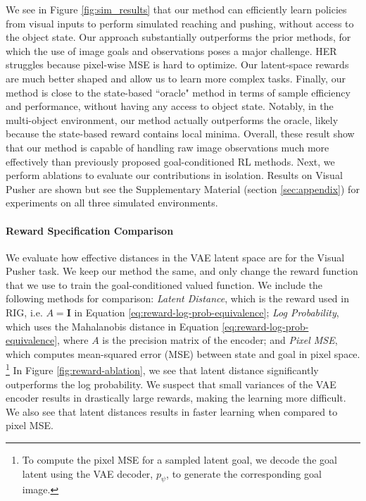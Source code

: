 \documentclass{article}
\begin{document}
We see in Figure \ref{fig:sim_results} that our method can efficiently learn policies from visual inputs to perform simulated reaching and pushing, without access to the object state.
Our approach substantially outperforms the prior methods, for which the use of image goals and observations poses a major challenge.
HER struggles because pixel-wise MSE is hard to optimize. Our latent-space rewards are much better shaped and allow us to learn more complex tasks.
Finally, our method is close to the state-based ``oracle" method in terms of sample efficiency and performance, without having any access to object state.
Notably, in the multi-object environment, our method actually outperforms the oracle, likely because the state-based reward contains local minima.
Overall, these result show that our method is capable of handling raw image observations much more effectively than previously proposed goal-conditioned RL methods. Next, we perform ablations to evaluate our contributions in isolation. Results on Visual Pusher are shown but see the Supplementary Material (section \ref{sec:appendix}) for experiments on all three simulated environments.

\vspace{-0.1in}
\paragraph{Reward Specification Comparison}

We evaluate how effective distances in the VAE latent space are for the Visual Pusher task.
We keep our method the same, and only change the reward function that we use to train the goal-conditioned valued function.
We include the following methods for comparison:
\textit{Latent Distance}, which is the reward used in RIG, i.e. $A = \mathbf{I}$ in Equation \eqref{eq:reward-log-prob-equivalence};
\textit{Log Probability}, which uses the Mahalanobis distance in Equation \eqref{eq:reward-log-prob-equivalence}, where $A$ is the precision matrix of the encoder;
and \textit{Pixel MSE}, which computes mean-squared error (MSE) between state and goal in pixel space.
\footnote{To compute the pixel MSE for a sampled latent goal, we decode the goal latent using the VAE decoder, $p_\psi$, to generate the corresponding goal image.}
In Figure \ref{fig:reward-ablation}, we see that latent distance significantly outperforms the log probability.
We suspect that small variances of the VAE encoder results in drastically large rewards, making the learning more difficult.
We also see that latent distances results in faster learning when compared to pixel MSE.
\end{document}
